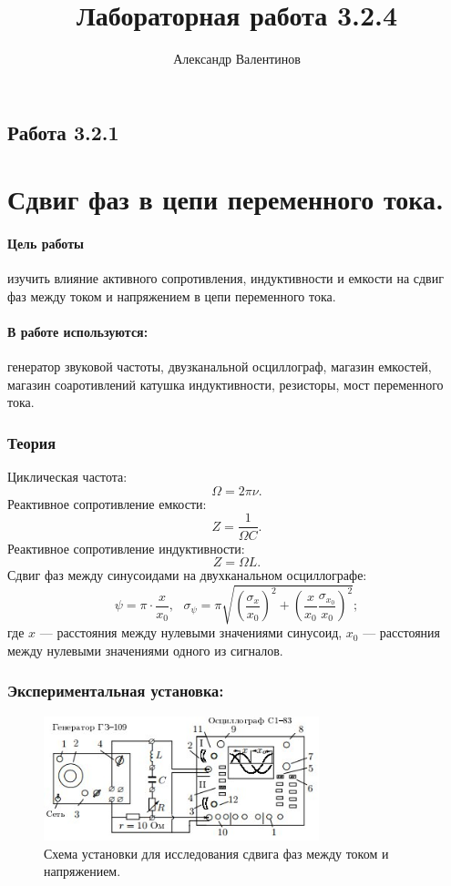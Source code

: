 \documentclass{article}
\author{Александр Валентинов}
\title{Лабораторная работа 3.2.4}
\begin{document}
   \subsection*{Работа 3.2.1}
   \section*{Сдвиг фаз в цепи переменного тока.}
   
   \paragraph{Цель работы} изучить влияние активного сопротивления, индуктивности и емкости на сдвиг фаз между током и напряжением в цепи переменного тока.
   
   \paragraph{В работе используются:} генератор звуковой частоты, двузканальной осциллограф, магазин емкостей, магазин соаротивлений катушка индуктивности, резисторы, мост переменного тока.

   \subsubsection*{Теория}
   Циклическая частота: \[ \Omega = 2\pi\nu. \]
   Реактивное сопротивление емкости: \[ Z = \frac{1}{\Omega C}. \]
   Реактивное сопротивление индуктивности: \[ Z = \Omega L. \]
   Сдвиг фаз между синусоидами на двухканальном осциллографе: 
   \begin{equation}
   \label{psi} 
   \psi = \pi \cdot \frac{x}{x_0},~~~ \sigma_\psi = \pi\sqrt{\left( \frac{\sigma_x}{x_0} \right)^2 + \left( \frac{x}{x_0} \frac{\sigma_{x_0}}{x_0} \right)^2};
   \end{equation}
   где $x$ --- расстояния между нулевыми значениями синусоид, $x_0$ --- расстояния между нулевыми значениями одного из сигналов. 

   \subsubsection*{Экспериментальная установка:}   

   \begin{figure}[h]
   \centering
   \includegraphics[width=8cm]{fig3.jpg} 
   \caption{Схема установки для исследования сдвига фаз между током и напряжением.} 
   \label{fig.1} 
   \end{figure}
\end{document}
